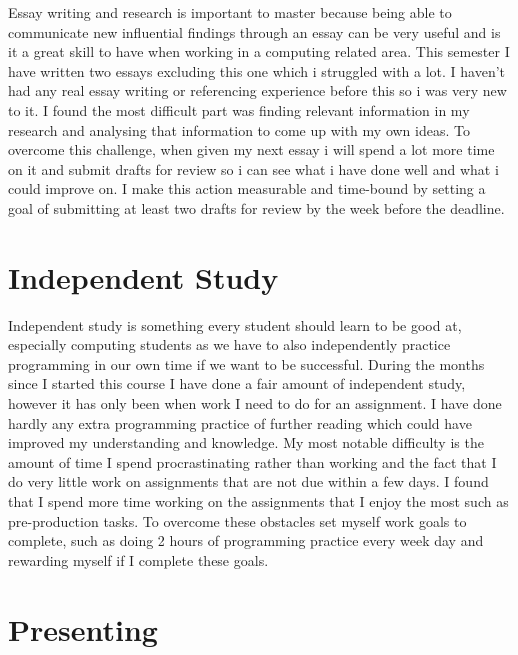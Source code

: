 \documentclass{scrartcl}
\begin{document}
Essay writing and research is important to master because being able to communicate new influential findings through an essay can be very useful and is it a great skill to have when working in a computing related area. This semester I have written two essays excluding this one which i struggled with a lot. I haven't had any real essay writing or referencing experience before this so i was very new to it. I found the most difficult part was finding relevant information in my research and analysing that information to come up with my own ideas. To overcome this challenge, when given my next essay i will spend a lot more time on it and submit drafts for review so i can see what i have done well and what i could improve on. I make this action measurable and time-bound by setting a goal of submitting at least two drafts for review by the week before the deadline.    

\section{Independent Study}

Independent study is something every student should learn to be good at, especially computing students as we have to also independently practice programming in our own time if we want to be successful. During the months since I started this course I have done a fair amount of independent study, however it has only been when work I need to do for an assignment. I have done hardly any extra programming practice of further reading which could have improved my understanding and knowledge. My most notable difficulty is the amount of time I spend procrastinating rather than working and the fact that I do very little work on assignments that are not due within a few days. I found that I spend more time working on the assignments that I enjoy the most such as pre-production tasks. To overcome these obstacles set myself work goals to complete, such as doing 2 hours of programming practice every week day and rewarding myself if I complete these goals.   

\section{Presenting}
\end{document}
